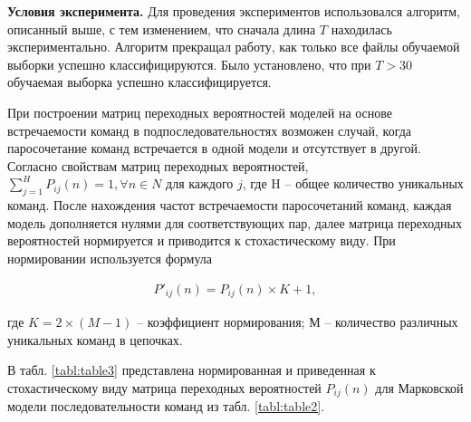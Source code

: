 \documentclass{book}
\begin{document}
\textbf{Условия эксперимента.} Для проведения экспериментов использовался алгоритм, описанный выше, с тем изменением, 
что сначала длина $T$ находилась экспериментально. Алгоритм прекращал работу, как только все файлы обучаемой выборки 
успешно классифицируются. Было установлено, что при $T > 30$ обучаемая выборка успешно классифицируется. 

При построении матриц переходных вероятностей моделей на основе встречаемости команд в подпоследовательностях возможен 
случай, когда паросочетание команд встречается в одной модели и отсутствует в другой. Согласно свойствам матриц переходных 
вероятностей, \( \sum_{j=1}^{H} P_{ij}(n) = 1,  \forall n \in N\) для каждого $j$, где H – общее количество уникальных команд. 
После нахождения частот встречаемости паросочетаний команд, каждая модель
дополняется нулями для соответствующих пар, далее матрица переходных вероятностей
нормируется и приводится к стохастическому виду. При нормировании используется формула 
\begin{large}
	\begin{equation}\label{eqn:eq3}
		\begin{gathered}
			P'_{ij}(n) = P_{ij}(n) \times K + 1,
		\end{gathered}
	\end{equation}
\end{large}
где $K = 2\times(M - 1)$ – коэффициент нормирования; М – количество различных уникальных команд в цепочках.

В табл. \ref{tabl:table3} представлена нормированная и приведенная к стохастическому виду матрица переходных 
вероятностей $P_{ij}(n)$ для Марковской модели последовательности команд из табл. \ref{tabl:table2}.

\end{document}
